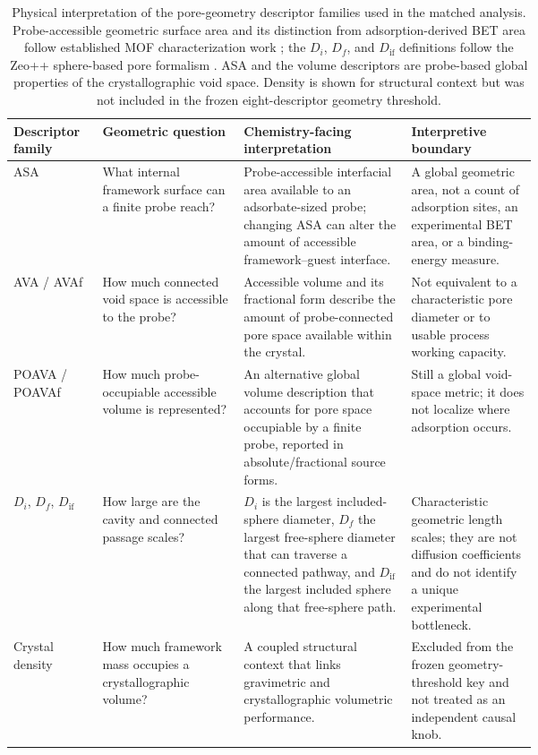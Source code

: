 \documentclass[11pt,a4paper]{article}
\begin{document}
\begin{table}[H]
\centering
\small
\caption{Physical interpretation of the pore-geometry descriptor families used in
the matched analysis. Probe-accessible geometric surface area and its distinction
from adsorption-derived BET area follow established MOF characterization work
\cite{duren2007surface,walton2007bet}; the $D_i$, $D_f$, and
$D_{\mathrm{if}}$ definitions follow the Zeo++ sphere-based pore formalism
\cite{willems2012zeopp}. ASA and the volume descriptors are probe-based global
properties of the crystallographic void space. Density is shown for structural
context but was not included in the frozen eight-descriptor geometry threshold.}
\label{tab:descriptor-translation}
\begin{tabularx}{\linewidth}{>{\raggedright\arraybackslash}p{0.17\linewidth}
                              >{\raggedright\arraybackslash}p{0.27\linewidth}
                              >{\raggedright\arraybackslash}X
                              >{\raggedright\arraybackslash}p{0.24\linewidth}}
\toprule
Descriptor family & Geometric question & Chemistry-facing interpretation &
Interpretive boundary \\
\midrule
ASA &
What internal framework surface can a finite probe reach? &
Probe-accessible interfacial area available to an adsorbate-sized probe; changing
ASA can alter the amount of accessible framework--guest interface. &
A global geometric area, not a count of adsorption sites, an experimental BET area,
or a binding-energy measure. \\
\addlinespace
AVA / AVAf &
How much connected void space is accessible to the probe? &
Accessible volume and its fractional form describe the amount of probe-connected
pore space available within the crystal. &
Not equivalent to a characteristic pore diameter or to usable process working
capacity. \\
\addlinespace
POAVA / POAVAf &
How much probe-occupiable accessible volume is represented? &
An alternative global volume description that accounts for pore space occupiable
by a finite probe, reported in absolute/fractional source forms. &
Still a global void-space metric; it does not localize where adsorption occurs. \\
\addlinespace
$D_i$, $D_f$, $D_{\mathrm{if}}$ &
How large are the cavity and connected passage scales? &
$D_i$ is the largest included-sphere diameter, $D_f$ the largest free-sphere
diameter that can traverse a connected pathway, and $D_{\mathrm{if}}$ the largest
included sphere along that free-sphere path. &
Characteristic geometric length scales; they are not diffusion coefficients and do
not identify a unique experimental bottleneck. \\
\addlinespace
Crystal density &
How much framework mass occupies a crystallographic volume? &
A coupled structural context that links gravimetric and crystallographic volumetric
performance. &
Excluded from the frozen geometry-threshold key and not treated as an independent
causal knob. \\
\bottomrule
\end{tabularx}
\end{table}
\end{document}
